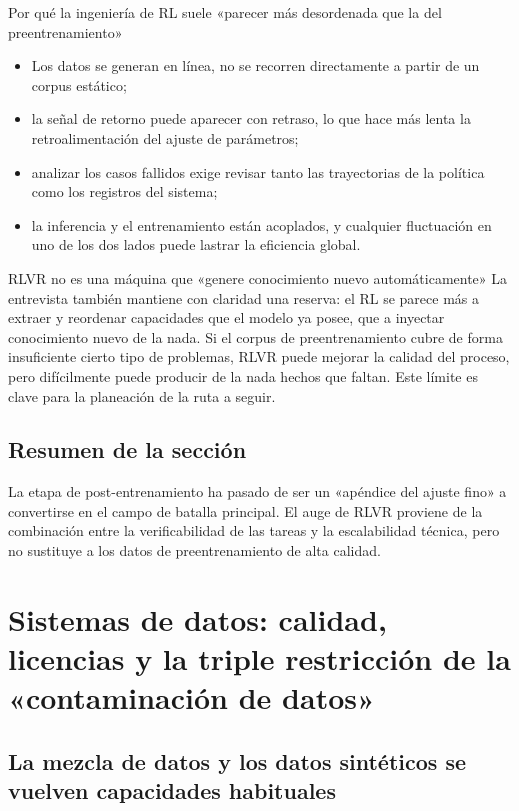 \documentclass[a4paper]{article}
\begin{document}
\begin{knowledgebox}{Por qué la ingeniería de RL suele «parecer más desordenada que la del preentrenamiento»}
\begin{itemize}[leftmargin=1.5em]
    \item Los datos se generan en línea, no se recorren directamente a partir de un corpus estático;
    \item la señal de retorno puede aparecer con retraso, lo que hace más lenta la retroalimentación del ajuste de parámetros;
    \item analizar los casos fallidos exige revisar tanto las trayectorias de la política como los registros del sistema;
    \item la inferencia y el entrenamiento están acoplados, y cualquier fluctuación en uno de los dos lados puede lastrar la eficiencia global.
\end{itemize}
\end{knowledgebox}

\begin{warningbox}{RLVR no es una máquina que «genere conocimiento nuevo automáticamente»}
La entrevista también mantiene con claridad una reserva: el RL se parece más a extraer y reordenar capacidades que el modelo ya posee, que a inyectar conocimiento nuevo de la nada. Si el corpus de preentrenamiento cubre de forma insuficiente cierto tipo de problemas, RLVR puede mejorar la calidad del proceso, pero difícilmente puede producir de la nada hechos que faltan. Este límite es clave para la planeación de la ruta a seguir.
\end{warningbox}

\subsection{Resumen de la sección}

La etapa de post-entrenamiento ha pasado de ser un «apéndice del ajuste fino» a convertirse en el campo de batalla principal. El auge de RLVR proviene de la combinación entre la verificabilidad de las tareas y la escalabilidad técnica, pero no sustituye a los datos de preentrenamiento de alta calidad.
\section{Sistemas de datos: calidad, licencias y la triple restricción de la «contaminación de datos»}

\subsection{La mezcla de datos y los datos sintéticos se vuelven capacidades habituales}
\end{document}
